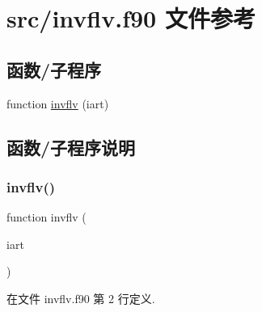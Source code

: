 \hypertarget{invflv_8f90}{}\section{src/invflv.f90 文件参考}
\label{invflv_8f90}
\subsection*{函数/子程序}
\begin{DoxyCompactItemize}
\item 
function \mbox{\hyperlink{invflv_8f90_a068b3f09648c1581f3ab054c2ca7fef0}{invflv}} (iart)
\end{DoxyCompactItemize}


\subsection{函数/子程序说明}
\mbox{\label{invflv_8f90_a068b3f09648c1581f3ab054c2ca7fef0}} 
\subsubsection{\texorpdfstring{invflv()}{invflv()}}
{\footnotesize\ttfamily function invflv (\begin{DoxyParamCaption}\item[{}]{iart }\end{DoxyParamCaption})}



在文件 invflv.\+f90 第 2 行定义.

